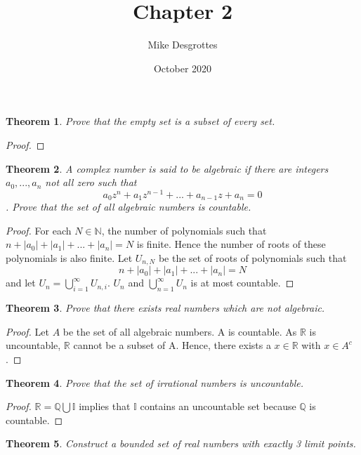 \documentclass{article}
\title{Chapter 2}
\author{Mike Desgrottes}
\date{October 2020}
\theoremstyle{plain}
\newtheorem{theorem}{Theorem}
\theoremstyle{definition}
\begin{document}
\maketitle

\begin{theorem}
	Prove that the empty set is a subset of every set.
\end{theorem}

\begin{proof}
	
\end{proof}

\begin{theorem}
	A complex number is said to be algebraic if there are integers $a_{0},...,a_{n}$ not all zero such that $$a_{0}z^{n} + a_{1}z^{n - 1} + ... + a_{n - 1}z + a_{n} = 0 $$. Prove that the set of all algebraic numbers is countable.
\end{theorem}

\begin{proof}
	For each $N \in \mathbb{N}$, the number of polynomials such that $n + |a_{0}| + |a_{1}| + ... + |a_{n}| = N$ is finite. Hence the number of roots of these polynomials is also finite. Let $U_{n,N}$ be the set of roots of polynomials such that $$n + |a_{0}| + |a_{1}| + ... + |a_{n}| = N $$ and let $U_{n} = \bigcup_{i = 1}^{\infty} U_{n,i}$. $U_{n}$ and $\bigcup_{n = 1}^{\infty} U_{n}$ is at most countable.
\end{proof}

\begin{theorem}
	Prove that there exists real numbers which are not algebraic.
\end{theorem}

\begin{proof}
	Let $A$ be the set of all algebraic numbers. A is countable. As $\mathbb{R}$ is uncountable, $\mathbb{R}$ cannot be a subset of A. Hence, there exists a $x \in \mathbb{R}$ with $x \in A^{c}$.
\end{proof}

\begin{theorem}
	Prove that the set of irrational numbers is uncountable.
\end{theorem}

\begin{proof}
	$\mathbb{R} = \mathbb{Q} \bigcup \mathbb{I}$ implies that $\mathbb{I}$ contains an uncountable set because $\mathbb{Q}$ is countable.
\end{proof}

\begin{theorem}
	Construct a bounded set of real numbers with exactly 3 limit points.
\end{theorem}
\end{document}
